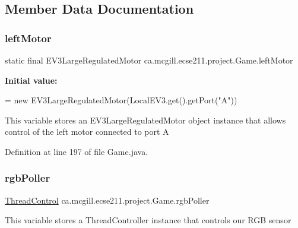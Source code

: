 \subsection{Member Data Documentation}
\mbox{\label{enumca_1_1mcgill_1_1ecse211_1_1project_1_1_game_a7c673571bf50fdb6917a9d7bb671e003}} 
\subsubsection{\texorpdfstring{left\+Motor}{leftMotor}}
{\footnotesize\ttfamily  static  final E\+V3\+Large\+Regulated\+Motor ca.\+mcgill.\+ecse211.\+project.\+Game.\+left\+Motor\hspace{0.3cm}{\ttfamily [static]}}

{\bfseries Initial value\+:}
\begin{DoxyCode}
=
      \textcolor{keyword}{new} EV3LargeRegulatedMotor(LocalEV3.get().getPort(\textcolor{stringliteral}{"A"}))
\end{DoxyCode}
This variable stores an E\+V3\+Large\+Regulated\+Motor object instance that allows control of the left motor connected to port A 

Definition at line 197 of file Game.\+java.

\mbox{\label{enumca_1_1mcgill_1_1ecse211_1_1project_1_1_game_af24a953a0c3438670220dde36c532b5d}} 
\subsubsection{\texorpdfstring{rgb\+Poller}{rgbPoller}}
{\footnotesize\ttfamily \hyperlink{classca_1_1mcgill_1_1ecse211_1_1threads_1_1_thread_control}{Thread\+Control} ca.\+mcgill.\+ecse211.\+project.\+Game.\+rgb\+Poller}

This variable stores a Thread\+Controller instance that controls our R\+GB sensor 

